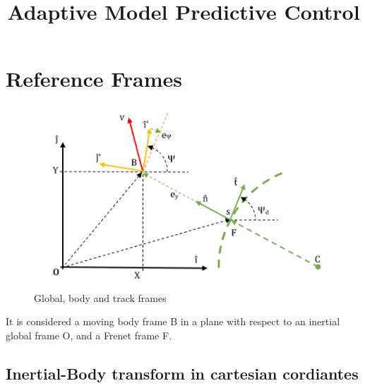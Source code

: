 \documentclass[12pt]{article}
\title{Adaptive Model Predictive Control}
\begin{document}
\maketitle





\section{Reference Frames}
    \begin{figure}[h]
        \label{frames}
        \centering
        \includegraphics[width=1\linewidth]{pictures/frames}
        \caption{Global, body and track frames}
    \end{figure}
    It is considered a moving body frame B in a plane with respect to an inertial
    global frame O, and a Frenet frame F.



    \subsection{Inertial-Body transform in cartesian cordiantes}
\end{document}
